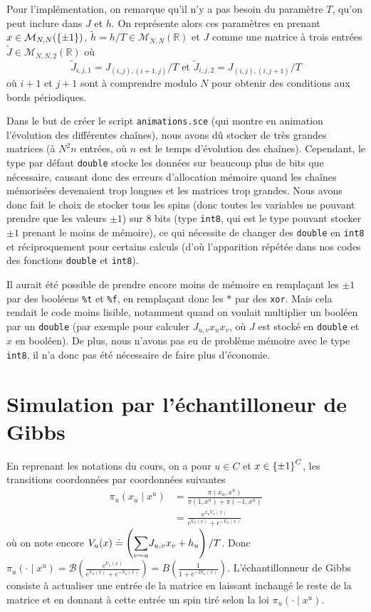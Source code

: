 \documentclass[a4paper,11pt]{article}
\begin{document}
Pour l'implémentation, on remarque qu'il n'y a pas besoin du paramètre $T$, qu'on peut inclure dans $J$ et $h$. On représente alors ces paramètres en prenant $x \in \mathcal M_{N,N}(\left\lbrace \pm 1 \right\rbrace)$, $\tilde h = h/T \in \mathcal M_{N,N}(\mathbb R)$ et $J$ comme une matrice à trois entrées $\tilde J \in \mathcal M_{N,N,2}(\mathbb R)$ où
$$\tilde J_{i,j,1} = J_{(i,j),(i+1,j)}/T \text{ et } \tilde J_{i,j,2} = J_{(i,j),(i,j+1)}/T$$
où $i+1$ et $j+1$ sont à comprendre modulo $N$ pour obtenir des conditions aux bords périodiques.

Dans le but de créer le script \texttt{animations.sce} (qui montre en animation l'évolution des différentes chaînes), nous avons dû stocker de très grandes matrices (à $N^2n$ entrées, où $n$ est le temps d'évolution des chaînes). Cependant, le type par défaut \texttt{double} stocke les données sur beaucoup plus de bits que nécessaire, causant donc des erreurs d'allocation mémoire quand les chaînes mémorisées devenaient trop longues et les matrices trop grandes. Nous avons donc fait le choix de stocker tous les spins (donc toutes les variables ne pouvant prendre que les valeurs $\pm 1$) sur 8 bits (type \texttt{int8}, qui est le type pouvant stocker $\pm 1$ prenant le moins de mémoire), ce qui nécessite de changer des \texttt{double} en \texttt{int8} et réciproquement pour certains calculs (d'où l'apparition répétée dans nos codes des fonctions \texttt{double} et \texttt{int8}).

Il aurait été possible de prendre encore moins de mémoire en remplaçant les $\pm 1$ par des booléens \texttt{\%t} et \texttt{\%f}, en remplaçant donc les $*$ par des \texttt{xor}. Mais cela rendait le code moins lisible, notamment quand on voulait multiplier un booléen par un \texttt{double} (par exemple pour calculer $J_{u,v} x_{u} x_{v}$, où $J$ est stocké en \texttt{double} et $x$ en booléen). De plus, nous n'avons pas eu de problème mémoire avec le type \texttt{int8}, il n'a donc pas été nécessaire de faire plus d'économie.

\section{Simulation par l'échantilloneur de Gibbs}\label{sec:gibbs}

En reprenant les notations du cours, on a pour $u \in C$ et $x \in \left\lbrace \pm 1 \right\rbrace^C$, les transitions coordonnées par coordonnées suivantes
\begin{align*}
\pi_u(x_u \mid x^u)
&= \frac{\pi(x_u,x^u)}{\pi(1,x^u) + \pi(-1,x^u)}\\
&= \frac{e^{x_u V_u(x)}}{e^{V_u(x)} + e^{-V_u(x)}}
\end{align*}
où on note encore $V_u(x) \doteq \left( \displaystyle{\sum_{v \sim u}^{}} J_{u,v} x_v + h_u \right) /T$. Donc $\pi_u(\cdot \mid x^u) = \mathcal B(\frac{e^{V_u(x)}}{e^{V_u(x)} + e^{-V_u(x)}}) = B(\frac{1}{1 + e^{-2V_u(x)}})$. L'échantillonneur de Gibbs consiste à actualiser une entrée de la matrice en laissant inchangé le reste de la matrice et en donnant à cette entrée un spin tiré selon la loi $\pi_u(\cdot \mid x^u)$.
\end{document}
